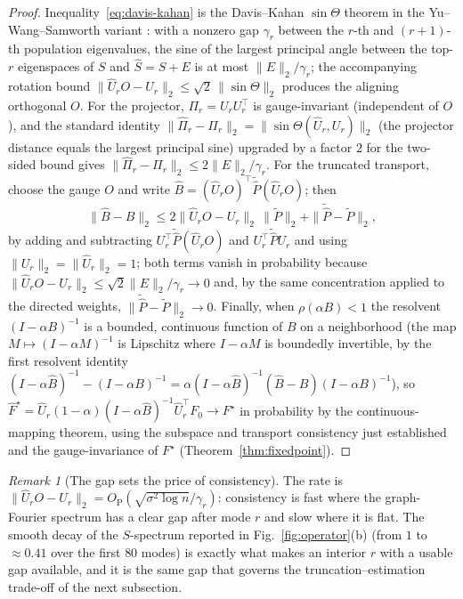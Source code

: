\documentclass[aps,prresearch,reprint,amsmath,amssymb,nofootinbib,superscriptaddress,floatfix]{revtex4-2}
\theoremstyle{definition}
\theoremstyle{remark}
\newtheorem{remark}[theorem]{Remark}
\theoremstyle{plain}
\begin{document}
\begin{proof}
Inequality~\eqref{eq:davis-kahan} is the Davis--Kahan $\sin\Theta$ theorem in the Yu--Wang--Samworth
variant \cite{yu2015useful}: with a nonzero gap $\gamma_r$ between the $r$-th and $(r{+}1)$-th population
eigenvalues, the sine of the largest principal angle between the top-$r$ eigenspaces of $S$ and
$\widehat S=S+E$ is at most $\|E\|_2/\gamma_r$; the accompanying rotation bound
$\|\widehat U_rO-U_r\|_2\le\sqrt2\,\|\sin\Theta\|_2$ produces the aligning orthogonal $O$. For the
projector, $\Pi_r=U_rU_r^\top$ is gauge-invariant (independent of $O$), and the standard identity
$\|\widehat\Pi_r-\Pi_r\|_2=\|\sin\Theta(\widehat U_r,U_r)\|_2$ (the projector distance equals the largest
principal sine) upgraded by a factor $2$ for the two-sided bound gives
$\|\widehat\Pi_r-\Pi_r\|_2\le2\|E\|_2/\gamma_r$. For the truncated transport, choose the gauge $O$ and write
$\widehat B=(\widehat U_rO)^\top\widetilde{\widehat P}(\widehat U_rO)$; then
\begin{equation}
\|\widehat B-B\|_2\le 2\|\widehat U_rO-U_r\|_2\,\|\widetilde P\|_2+\|\widetilde{\widehat P}-\widetilde
P\|_2,
\end{equation}
by adding and subtracting $U_r^\top\widetilde{\widehat P}(\widehat U_rO)$ and
$U_r^\top\widetilde{\widehat P}U_r$ and using $\|U_r\|_2=\|\widehat U_r\|_2=1$; both terms vanish in
probability because $\|\widehat U_rO-U_r\|_2\le\sqrt2\|E\|_2/\gamma_r\to0$ and, by the same concentration
applied to the directed weights, $\|\widetilde{\widehat P}-\widetilde P\|_2\to0$. Finally, when
$\rho(\alpha B)<1$ the resolvent $(I-\alpha B)^{-1}$ is a bounded, continuous function of $B$ on a
neighborhood (the map $M\mapsto(I-\alpha M)^{-1}$ is Lipschitz where $I-\alpha M$ is boundedly invertible, by
the first resolvent identity $(I-\alpha\widehat B)^{-1}-(I-\alpha B)^{-1}=\alpha(I-\alpha\widehat
B)^{-1}(\widehat B-B)(I-\alpha B)^{-1}$), so $\widehat F^\star=\widehat U_r(1-\alpha)(I-\alpha\widehat
B)^{-1}\widehat U_r^\top F_0\to F^\star$ in probability by the continuous-mapping theorem, using the
subspace and transport consistency just established and the gauge-invariance of $F^\star$
(Theorem~\ref{thm:fixedpoint}).
\end{proof}

\begin{remark}[The gap sets the price of consistency]
\label{rem:gap}
The rate is $\|\widehat U_rO-U_r\|_2=O_{\mathrm P}(\sqrt{\sigma^2\log n}/\gamma_r)$: consistency is fast where
the graph-Fourier spectrum has a clear gap after mode $r$ and slow where it is flat. The smooth decay of the
$S$-spectrum reported in Fig.~\ref{fig:operator}(b) (from $1$ to $\approx0.41$ over the first $80$ modes) is
exactly what makes an interior $r$ with a usable gap available, and it is the same gap that governs the
truncation--estimation trade-off of the next subsection.
\end{remark}
\end{document}
